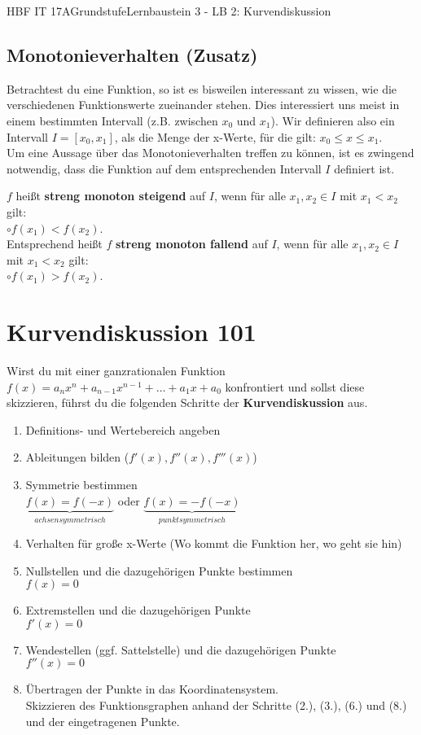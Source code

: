 \documentclass[11pt,twocolumn,oneside,openany,headings=optiontotoc,11pt,numbers=noenddot]{article}
\begin{document}
\begin{worksheet}{HBF IT 17A}{Grundstufe}{Lernbaustein 3 - LB 2: Kurvendiskussion}
		\subsection*{Monotonieverhalten \tiny{(Zusatz)}\normalsize} Betrachtest du eine Funktion, so ist es bisweilen interessant zu wissen, wie die verschiedenen Funktionswerte zueinander stehen. Dies interessiert uns meist in einem bestimmten Intervall (z.B. zwischen \(x_0\) und \(x_1\)). Wir definieren also ein Intervall \(I = [x_0,x_1]\), als die Menge der x-Werte, für die gilt: \(x_0 \leq x \leq x_1\).\\
		Um eine Aussage über das Monotonieverhalten treffen zu können, ist es zwingend notwendig, dass die Funktion auf dem entsprechenden Intervall \(I\) definiert ist.\\
		\par\noindent
		\(f\) heißt \textbf{streng monoton steigend} auf \(I\), wenn für alle \(x_1,x_2 \in I\) mit \(x_1<x_2\) gilt:\\
		\(\circ f(x_1)<f(x_2)\).\\
		Entsprechend heißt \(f\) \textbf{streng monoton fallend} auf \(I\), wenn für alle \(x_1,x_2 \in I\) mit \(x_1<x_2\) gilt:\\
		\(\circ f(x_1) > f(x_2)\).
		\newpage
		\section{Kurvendiskussion 101}
		Wirst du mit einer ganzrationalen Funktion \(f(x) = a_nx^n + a_{n-1}x^{n-1} +\ldots + a_1x +a_0\) konfrontiert und sollst diese skizzieren, führst du die folgenden Schritte der \textbf{Kurvendiskussion} aus.\\
		\begin{enumerate}
			\item Definitions- und Wertebereich angeben
			\item Ableitungen bilden (\(f'(x), f''(x), f'''(x)\))
			\item Symmetrie bestimmen\\
			\(\underbrace{f(x) = f(-x)}_{achsensymmetrisch}\) oder \(\underbrace{f(x) = -f(-x)}_{punktsymmetrisch}\)
			\item Verhalten für große x-Werte (\tiny{Wo kommt die Funktion her, wo geht sie hin}\normalsize)
			\item Nullstellen und die dazugehörigen Punkte bestimmen\\
			\(f(x) = 0\)
			\item Extremstellen und die dazugehörigen Punkte\\
			\(f'(x) = 0\)
			\item Wendestellen (ggf. Sattelstelle) und die dazugehörigen Punkte\\
			\(f''(x) = 0\)
			\item Übertragen der Punkte in das Koordinatensystem.\\
			Skizzieren des Funktionsgraphen anhand der Schritte (2.), (3.), (6.) und (8.) und der eingetragenen Punkte.
		\end{enumerate}
	\end{worksheet}
\end{document}
